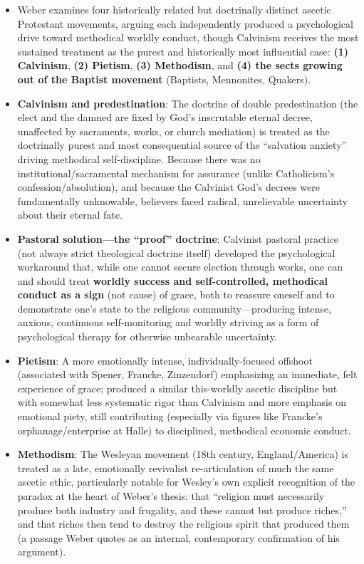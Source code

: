 \documentclass[12pt]{article}
\begin{document}
\begin{itemize}[leftmargin=*, itemsep=4pt]
    \item Weber examines four historically related but doctrinally distinct ascetic Protestant movements, arguing each independently produced a psychological drive toward methodical worldly conduct, though Calvinism receives the most sustained treatment as the purest and historically most influential case: \textbf{(1) Calvinism}, \textbf{(2) Pietism}, \textbf{(3) Methodism}, and \textbf{(4) the sects growing out of the Baptist movement} (Baptists, Mennonites, Quakers).
    \item \textbf{Calvinism and predestination}: The doctrine of double predestination (the elect and the damned are fixed by God's inscrutable eternal decree, unaffected by sacraments, works, or church mediation) is treated as the doctrinally purest and most consequential source of the ``salvation anxiety'' driving methodical self-discipline. Because there was no institutional/sacramental mechanism for assurance (unlike Catholicism's confession/absolution), and because the Calvinist God's decrees were fundamentally unknowable, believers faced radical, unrelievable uncertainty about their eternal fate.
    \item \textbf{Pastoral solution---the ``proof'' doctrine}: Calvinist pastoral practice (not always strict theological doctrine itself) developed the psychological workaround that, while one cannot secure election through works, one can and should treat \textbf{worldly success and self-controlled, methodical conduct as a sign} (not cause) of grace, both to reassure oneself and to demonstrate one's state to the religious community---producing intense, anxious, continuous self-monitoring and worldly striving as a form of psychological therapy for otherwise unbearable uncertainty.
    \item \textbf{Pietism}: A more emotionally intense, individually-focused offshoot (associated with Spener, Francke, Zinzendorf) emphasizing an immediate, felt experience of grace; produced a similar this-worldly ascetic discipline but with somewhat less systematic rigor than Calvinism and more emphasis on emotional piety, still contributing (especially via figures like Francke's orphanage/enterprise at Halle) to disciplined, methodical economic conduct.
    \item \textbf{Methodism}: The Wesleyan movement (18th century, England/America) is treated as a late, emotionally revivalist re-articulation of much the same ascetic ethic, particularly notable for Wesley's own explicit recognition of the paradox at the heart of Weber's thesis: that ``religion must necessarily produce both industry and frugality, and these cannot but produce riches,'' and that riches then tend to destroy the religious spirit that produced them (a passage Weber quotes as an internal, contemporary confirmation of his argument).

\end{itemize}
\end{document}
